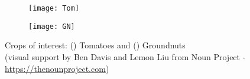 \begin{figure}[h!]
	\centering
	\begin{subfigure}[b]{0.35\linewidth}
		\centering\texttt{[image: Tom]}
		\captionsetup{justification=centering}		
		\caption{\label{fig:Tom}}
		\end{subfigure}%
	\begin{subfigure}[b]{0.35\linewidth}
        \centering\texttt{[image: GN]}
		\captionsetup{justification=centering}		
		\caption{\label{fig:GN}}
		\end{subfigure}
		\captionsetup{justification=centering}	
	\caption[Crops of interest: () Tomatoes and () Groundnuts]{Crops of interest: () Tomatoes and () Groundnuts \\ (visual support by Ben Davis and Lemon Liu from Noun Project - \url{https://thenounproject.com})} 
	\label{fig:Crops}
\end{figure}

